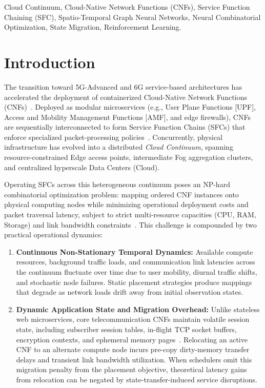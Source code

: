 \documentclass[conference]{IEEEtran}
\begin{document}
\begin{IEEEkeywords}
Cloud Continuum, Cloud-Native Network Functions (CNFs), Service Function Chaining (SFC), Spatio-Temporal Graph Neural Networks, Neural Combinatorial Optimization, State Migration, Reinforcement Learning.
\end{IEEEkeywords}

\section{Introduction}
\label{sec:intro}

The transition toward 5G-Advanced and 6G service-based architectures has accelerated the deployment of containerized Cloud-Native Network Functions (CNFs)~\cite{mijumbi2016network}. Deployed as modular microservices (e.g., User Plane Functions [UPF], Access and Mobility Management Functions [AMF], and edge firewalls), CNFs are sequentially interconnected to form Service Function Chains (SFCs) that enforce specialized packet-processing policies~\cite{herrera2016resource}. Concurrently, physical infrastructure has evolved into a distributed \textit{Cloud Continuum}, spanning resource-constrained Edge access points, intermediate Fog aggregation clusters, and centralized hyperscale Data Centers (Cloud).

Operating SFCs across this heterogeneous continuum poses an NP-hard combinatorial optimization problem: mapping ordered CNF instances onto physical computing nodes while minimizing operational deployment costs and packet traversal latency, subject to strict multi-resource capacities (CPU, RAM, Storage) and link bandwidth constraints~\cite{peixoto2020survey}. This challenge is compounded by two practical operational dynamics:

\begin{enumerate}
    \item \textbf{Continuous Non-Stationary Temporal Dynamics:} Available compute resources, background traffic loads, and communication link latencies across the continuum fluctuate over time due to user mobility, diurnal traffic shifts, and stochastic node failures. Static placement strategies produce mappings that degrade as network loads drift away from initial observation states.
    \item \textbf{Dynamic Application State and Migration Overhead:} Unlike stateless web microservices, core telecommunication CNFs maintain volatile session state, including subscriber session tables, in-flight TCP socket buffers, encryption contexts, and ephemeral memory pages~\cite{clark2005live}. Relocating an active CNF to an alternate compute node incurs pre-copy dirty-memory transfer delays and transient link bandwidth utilization. When schedulers omit this migration penalty from the placement objective, theoretical latency gains from relocation can be negated by state-transfer-induced service disruptions.
\end{enumerate}
\end{document}
